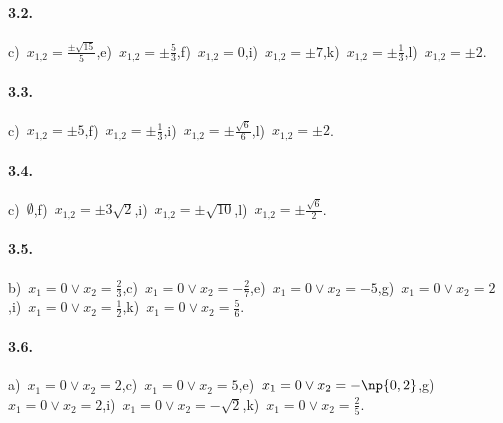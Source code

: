 \paragraph{3.2.} c)~$x_{1\text{,}2} = \frac{\pm \sqrt{15}}{5}$,\quad e)~$x_{1\text{,}2} = \pm\frac{5}{3}$,\quad f)~$x_{1\text{,}2} = 0$,\quad i)~$x_{1\text{,}2} = \pm 7$,\quad k)~$x_{1\text{,}2} = \pm\frac{1}{3}$,\quad l)~$x_{1\text{,}2} = \pm 2$.

\paragraph{3.3.} c)~$x_{1\text{,}2} = \pm 5$,\quad f)~$x_{1\text{,}2} = \pm \frac{1}{3}$,\quad i)~$x_{1\text{,}2} = \pm \frac{\sqrt{6}}{6}$,\quad l)~$x_{1\text{,}2} = \pm 2$.

\paragraph{3.4.} c)~$\emptyset$,\quad f)~$x_{1\text{,}2} = \pm 3 \sqrt{2}$,\quad i)~$x_{1\text{,}2} = \pm \sqrt{10}$,\quad l)~$x_{1\text{,}2} = \pm \frac{\sqrt{6}}{2}$.

\paragraph{3.5.} b)~$x_{1} = 0 \vee x_{2} = \frac{2}{3}$,\quad c)~$x_{1} = 0 \vee x_{2} = - \frac{2}{7}$,\quad e)~$x_{1} = 0 \vee x_{2} = - 5$,\quad g)~$x_{1} = 0 \vee x_{2} = 2$,\quad i)~$x_{1} = 0 \vee x_{2} = \frac{1}{2}$,\quad k)~$x_{1} = 0 \vee x_{2} = \frac{5}{6}$.


\paragraph{3.6.} a)~$x_{1} = 0 \vee x_{2} = 2$,\quad c)~$x_{1} = 0 \vee x_{2} = 5$,\quad e)~$x_{1} = 0 \vee x_{2} = - \np{0,2}$,\quad g)~$x_{1} = 0 \vee x_{2} = 2$,\quad i)~$x_{1} = 0 \vee x_{2} = - \sqrt{2}$,\quad k)~$x_{1} = 0 \vee x_{2} = \frac{2}{5}$.


